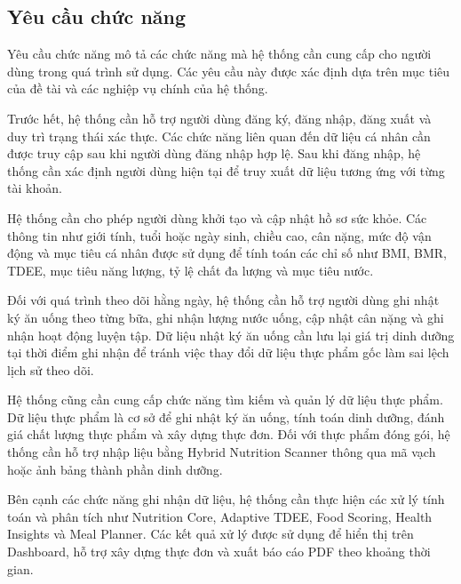 \documentclass[12pt, a4paper]{report}
\begin{document}
\subsection{Yêu cầu chức năng}Yêu cầu chức năng mô tả các chức năng mà hệ thống cần cung cấp cho người dùng trong quá trình sử dụng. Các yêu cầu này được xác định dựa trên mục tiêu của đề tài và các nghiệp vụ chính của hệ thống.

Trước hết, hệ thống cần hỗ trợ người dùng đăng ký, đăng nhập, đăng xuất và duy trì trạng thái xác thực. Các chức năng liên quan đến dữ liệu cá nhân cần được truy cập sau khi người dùng đăng nhập hợp lệ. Sau khi đăng nhập, hệ thống cần xác định người dùng hiện tại để truy xuất dữ liệu tương ứng với từng tài khoản.

Hệ thống cần cho phép người dùng khởi tạo và cập nhật hồ sơ sức khỏe. Các thông tin như giới tính, tuổi hoặc ngày sinh, chiều cao, cân nặng, mức độ vận động và mục tiêu cá nhân được sử dụng để tính toán các chỉ số như BMI, BMR, TDEE, mục tiêu năng lượng, tỷ lệ chất đa lượng và mục tiêu nước.

Đối với quá trình theo dõi hằng ngày, hệ thống cần hỗ trợ người dùng ghi nhật ký ăn uống theo từng bữa, ghi nhận lượng nước uống, cập nhật cân nặng và ghi nhận hoạt động luyện tập. Dữ liệu nhật ký ăn uống cần lưu lại giá trị dinh dưỡng tại thời điểm ghi nhận để tránh việc thay đổi dữ liệu thực phẩm gốc làm sai lệch lịch sử theo dõi.

Hệ thống cũng cần cung cấp chức năng tìm kiếm và quản lý dữ liệu thực phẩm. Dữ liệu thực phẩm là cơ sở để ghi nhật ký ăn uống, tính toán dinh dưỡng, đánh giá chất lượng thực phẩm và xây dựng thực đơn. Đối với thực phẩm đóng gói, hệ thống cần hỗ trợ nhập liệu bằng Hybrid Nutrition Scanner thông qua mã vạch hoặc ảnh bảng thành phần dinh dưỡng.

Bên cạnh các chức năng ghi nhận dữ liệu, hệ thống cần thực hiện các xử lý tính toán và phân tích như Nutrition Core, Adaptive TDEE, Food Scoring, Health Insights và Meal Planner. Các kết quả xử lý được sử dụng để hiển thị trên Dashboard, hỗ trợ xây dựng thực đơn và xuất báo cáo PDF theo khoảng thời gian.
\end{document}
